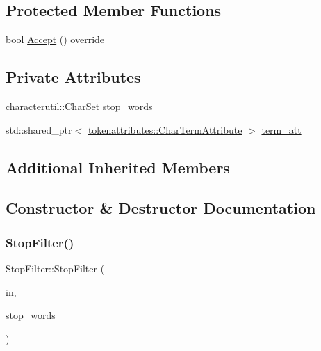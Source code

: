 \subsection*{Protected Member Functions}
\begin{DoxyCompactItemize}
\item 
bool \mbox{\hyperlink{classlucene_1_1core_1_1analysis_1_1StopFilter_af05114955fb7b1deb340a7fe1e07735e}{Accept}} () override
\end{DoxyCompactItemize}
\subsection*{Private Attributes}
\begin{DoxyCompactItemize}
\item 
\mbox{\hyperlink{classlucene_1_1core_1_1analysis_1_1characterutil_1_1CharSet}{characterutil\+::\+Char\+Set}} \mbox{\hyperlink{classlucene_1_1core_1_1analysis_1_1StopFilter_ace188f785bcebdc0f18a73116da1afd0}{stop\+\_\+words}}
\item 
std\+::shared\+\_\+ptr$<$ \mbox{\hyperlink{classlucene_1_1core_1_1analysis_1_1tokenattributes_1_1CharTermAttribute}{tokenattributes\+::\+Char\+Term\+Attribute}} $>$ \mbox{\hyperlink{classlucene_1_1core_1_1analysis_1_1StopFilter_aa625432d1343f5a67be010bde710a986}{term\+\_\+att}}
\end{DoxyCompactItemize}
\subsection*{Additional Inherited Members}


\subsection{Constructor \& Destructor Documentation}
\mbox{\label{classlucene_1_1core_1_1analysis_1_1StopFilter_ac7db0ba3cf53a65d25442b1a2b290156}} 
\subsubsection{\texorpdfstring{Stop\+Filter()}{StopFilter()}\hspace{0.1cm}{\footnotesize\ttfamily [1/4]}}
{\footnotesize\ttfamily Stop\+Filter\+::\+Stop\+Filter (\begin{DoxyParamCaption}\item[{\mbox{\hyperlink{classlucene_1_1core_1_1analysis_1_1TokenStream}{Token\+Stream}} $\ast$}]{in,  }\item[{\mbox{\hyperlink{classlucene_1_1core_1_1analysis_1_1characterutil_1_1CharSet}{characterutil\+::\+Char\+Set}} \&}]{stop\+\_\+words }\end{DoxyParamCaption})}

